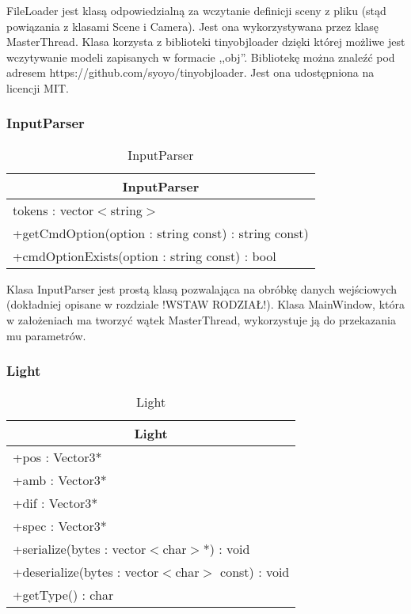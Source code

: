 FileLoader jest klasą odpowiedzialną za wczytanie definicji sceny z pliku (stąd powiązania z klasami Scene i Camera). Jest ona wykorzystywana przez klasę MasterThread. Klasa korzysta z biblioteki tinyobjloader dzięki której możliwe jest wczytywanie modeli zapisanych w formacie ,,obj''. Bibliotekę można znaleźć pod adresem https://github.com/syoyo/tinyobjloader. Jest ona udostępniona na licencji MIT.

\subsubsection{InputParser}

\footnotesize
\begin{longtable}{|p{14cm}|}
    \caption{InputParser} \label{tab:InputParser} \\ \hline
    \multicolumn{1}{|c|}{InputParser} \\ \hline
    tokens : vector$<$string$>$  \\ \hline
    +getCmdOption(option : string const) : string const) \\
    +cmdOptionExists(option : string const) : bool \\ \hline
\end{longtable}
\normalsize

Klasa InputParser jest prostą klasą pozwalająca na obróbkę danych wejściowych (dokładniej opisane w rozdziale !WSTAW RODZIAŁ!). Klasa MainWindow, która w założeniach ma tworzyć wątek MasterThread, wykorzystuje ją do przekazania mu parametrów.

\subsubsection{Light}

\footnotesize
\begin{longtable}{|p{14cm}|}
    \caption{Light} \label{tab:Light} \\ \hline
    \multicolumn{1}{|c|}{Light} \\ \hline
    +pos : Vector3* \\ 
    +amb : Vector3* \\
    +dif : Vector3* \\
    +spec : Vector3* \\
    \hline
	+serialize(bytes : vector$<$char$>$*) : void \\ 
	+deserialize(bytes : vector$<$char$>$ const) : void \\
	+getType() : char \\
	\hline
\end{longtable}
\normalsize

